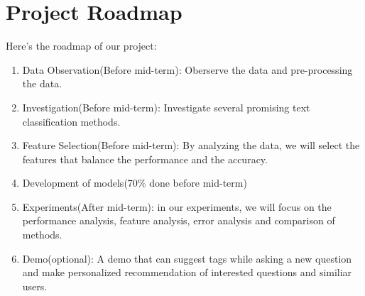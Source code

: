 \documentclass{article} %
\begin{document}
\section{Project Roadmap}
Here's the roadmap of our project:
\begin{enumerate}
    \item Data Observation(Before mid-term): Oberserve the data and pre-processing the data.
    \item Investigation(Before mid-term): Investigate several promising text classification methods.
    \item Feature Selection(Before mid-term): By analyzing the data, we will select the features that balance the performance and the accuracy.
    \item Development of models(70\% done before mid-term)
    \item Experiments(After mid-term): in our experiments, we will focus on the performance analysis, feature analysis, error analysis and comparison of methods.
    \item Demo(optional): A demo that can suggest tags while asking a new question and make personalized recommendation of interested questions and similiar users.
\end{enumerate}
\end{document}
